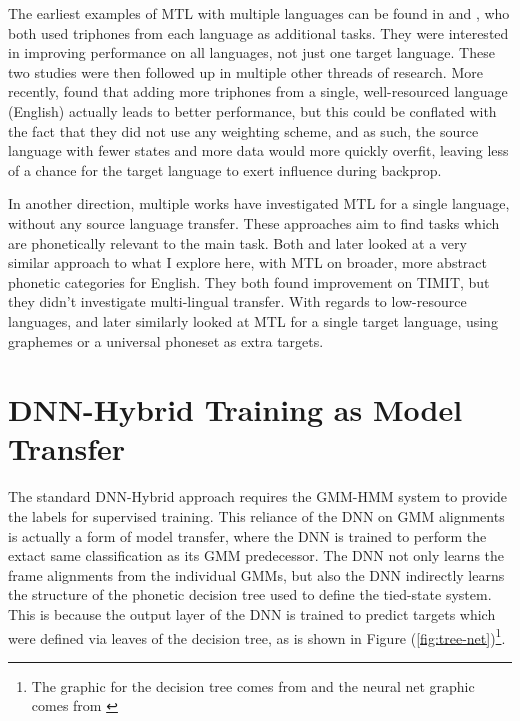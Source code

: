 \documentclass[a4paper]{article}
\begin{document}
The earliest examples of MTL with multiple languages can be found in \cite{huang2013} and \cite{heigold2013}, who both used triphones from each language as additional tasks. They were interested in improving performance on all languages, not just one target language. These two studies were then followed up in multiple other threads of research. More recently, \cite{grezl2016} found that adding more triphones from a single, well-resourced language (English) actually leads to better performance, but this could be conflated with the fact that they did not use any weighting scheme, and as such, the source language with fewer states and more data would more quickly overfit, leaving less of a chance for the target language to exert influence during backprop.


In another direction, multiple works have investigated MTL for a single language, without any source language transfer. These approaches aim to find tasks which are phonetically relevant to the main task. Both \cite{seltzer2013} and later \cite{huang2015} looked at a very similar approach to what I explore here, with MTL on broader, more abstract phonetic categories for English. They both found improvement on TIMIT, but they didn't investigate multi-lingual transfer. With regards to low-resource languages, \cite{chen2014} and later \cite{chen2015} similarly looked at MTL for a single target language, using graphemes or a universal phoneset as extra targets.



\section{DNN-Hybrid Training as Model Transfer}

The standard DNN-Hybrid approach requires the GMM-HMM system to provide the labels for supervised training. This reliance of the DNN on GMM alignments is actually a form of model transfer, where the DNN is trained to perform the extact same classification as its GMM predecessor. The DNN not only learns the frame alignments from the individual GMMs, but also the DNN indirectly learns the structure of the phonetic decision tree used to define the tied-state system. This is because the output layer of the DNN is trained to predict targets which were defined via leaves of the decision tree, as is shown in Figure (\ref{fig:tree-net})\footnote{The graphic for the decision tree comes from \cite{young2002} and the neural net graphic comes from \cite{heigold2013}}.
\end{document}
